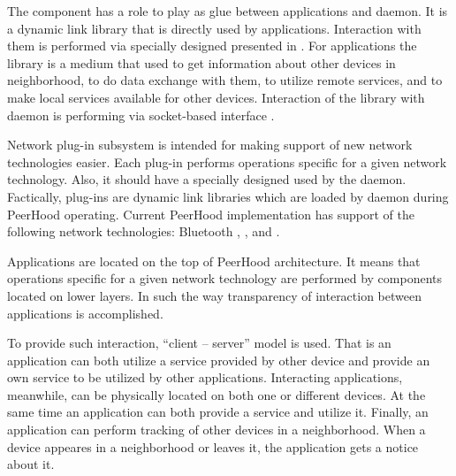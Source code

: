 
%
The component has a role to play as glue between applications and daemon. 
%
It is a dynamic link library that is directly used by applications. 
%
Interaction with them is performed via specially designed  presented in . 
%
For applications the library is a medium that used to get information about other devices in neighborhood, to do data exchange with them, to utilize remote services, and to make local services available for other devices. 
%
Interaction of the library with daemon is performing via socket-based interface . 



%
Network plug-in subsystem is intended for making support of new network technologies easier. 
%
Each plug-in performs operations specific for a given network technology. 
%
Also, it should have a specially designed  used by the daemon. 
%
Factically, plug-ins are dynamic link libraries which are loaded by daemon during PeerHood operating. 
%
Current PeerHood implementation has support of the following network technologies: Bluetooth ,  , and  . 



%
Applications are located on the top of PeerHood architecture. 
%
It means that operations specific for a given network technology are performed by components located on lower layers. 
%
In such the way transparency of interaction between applications is accomplished. 

%
To provide such interaction, ``client -- server'' model is used. 
%
That is an application can both utilize a service provided by other device and provide an own service to be utilized by other applications. 
%
Interacting applications, meanwhile, can be physically located on both one or different devices. 
%
At the same time an application can both provide a service and utilize it. 
%
Finally, an application can perform tracking of other devices in a neighborhood. 
%
When a device appeares in a neighborhood or leaves it, the application gets a notice about it. 